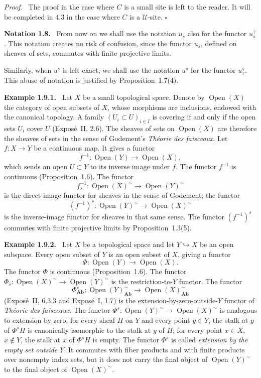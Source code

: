 \documentclass[11pt]{article}
\newcommand{\U}{\mathcal{U}}
\newcommand{\Ab}{\mathbf{Ab}}
\newcommand{\Ouv}{\operatorname{Open}}
\newcommand{\qedtext}{\hfill\(\square\)}
\newenvironment{remarktext}[1]{\par\medskip\noindent\textbf{#1.}\ }{\par\medskip}
\newenvironment{prooftext}{\par\noindent\emph{Proof.}\ }{\par\medskip}
\begin{document}
\begin{prooftext}
The proof in the case where \(C\) is a small site is left to the reader. It will be completed in 4.3 in the case where \(C\) is a \(\U\)-site. \qedtext
\end{prooftext}

\begin{remarktext}{Notation 1.8}
From now on we shall use the notation \(u_s\) also for the functor \(u_s^\gamma\). This notation creates no risk of confusion, since the functor \(u_s\), defined on sheaves of sets, commutes with finite projective limits.
\end{remarktext}

Similarly, when \(u^s\) is left exact, we shall use the notation \(u^s\) for the functor \(u^s_\gamma\). This abuse of notation is justified by Proposition~1.7(4).

\begin{remarktext}{Example 1.9.1}
Let \(X\) be a small topological space. Denote by \(\Ouv(X)\) the category of open subsets of \(X\), whose morphisms are inclusions, endowed with the canonical topology. A family \((U_i\subset U)_{i\in I}\) is covering if and only if the open sets \(U_i\) cover \(U\) (Expos\'e~II, 2.6). The sheaves of sets on \(\Ouv(X)\) are therefore the sheaves of sets in the sense of Godement's \emph{Th\'eorie des faisceaux}. Let \(f:X\to Y\) be a continuous map. It gives a functor
\[
f^{-1}:\Ouv(Y)\longrightarrow\Ouv(X),
\]
which sends an open \(U\subset Y\) to its inverse image under \(f\). The functor \(f^{-1}\) is continuous (Proposition~1.6). The functor
\[
f^{-1}_s:\Ouv(X)^{\sim}\longrightarrow\Ouv(Y)^{\sim}
\]
is the direct-image functor for sheaves in the sense of Godement; the functor
\[
(f^{-1})^s:\Ouv(Y)^{\sim}\longrightarrow\Ouv(X)^{\sim}
\]
is the inverse-image functor for sheaves in that same sense. The functor \((f^{-1})^s\) commutes with finite projective limits by Proposition~1.3(5).
\end{remarktext}

\begin{remarktext}{Example 1.9.2}
Let \(X\) be a topological space and let \(Y\hookrightarrow X\) be an open subspace. Every open subset of \(Y\) is an open subset of \(X\), giving a functor
\[
\Phi:\Ouv(Y)\longrightarrow\Ouv(X).
\]
The functor \(\Phi\) is continuous (Proposition~1.6). The functor \(\Phi_s:\Ouv(X)^\sim\to\Ouv(Y)^\sim\) is the restriction-to-\(Y\) functor. The functor
\[
\Phi^s_{\Ab}:\Ouv(Y)^\sim_{\Ab}\longrightarrow\Ouv(X)^\sim_{\Ab}
\]
(Expos\'e~II, 6.3.3 and Expos\'e~I, 1.7) is the extension-by-zero-outside-\(Y\) functor of \emph{Th\'eorie des faisceaux}. The functor \(\Phi^s:\Ouv(Y)^\sim\to\Ouv(X)^\sim\) is analogous to extension by zero: for every sheaf \(H\) on \(Y\) and every point \(y\in Y\), the stalk at \(y\) of \(\Phi^sH\) is canonically isomorphic to the stalk at \(y\) of \(H\); for every point \(x\in X\), \(x\notin Y\), the stalk at \(x\) of \(\Phi^sH\) is empty. The functor \(\Phi^s\) is called \emph{extension by the empty set outside \(Y\)}. It commutes with fiber products and with finite products over nonempty index sets, but it does not carry the final object of \(\Ouv(Y)^\sim\) to the final object of \(\Ouv(X)^\sim\).
\end{remarktext}
\end{document}
